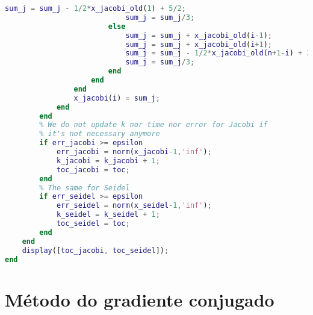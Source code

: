 \documentclass{article}
\begin{document}
\begin{lstlisting}[language=Matlab]
                            sum_j = sum_j - 1/2*x_jacobi_old(1) + 5/2;
                            sum_j = sum_j/3;
                        else
                            sum_j = sum_j + x_jacobi_old(i-1);
                            sum_j = sum_j + x_jacobi_old(i+1);
                            sum_j = sum_j - 1/2*x_jacobi_old(n+1-i) + 3/2;
                            sum_j = sum_j/3;
                        end
                    end
                end
                x_jacobi(i) = sum_j;
            end
        end
        % We do not update k nor time nor error for Jacobi if
        % it's not necessary anymore
        if err_jacobi >= epsilon
            err_jacobi = norm(x_jacobi-1,'inf');
            k_jacobi = k_jacobi + 1;
            toc_jacobi = toc;
        end
        % The same for Seidel
        if err_seidel >= epsilon
            err_seidel = norm(x_seidel-1,'inf');
            k_seidel = k_seidel + 1;
            toc_seidel = toc;
        end
    end
    display([toc_jacobi, toc_seidel]);
end
        \end{lstlisting}

    \section{Método do gradiente conjugado}
        \label{appendix:c}
\end{document}
